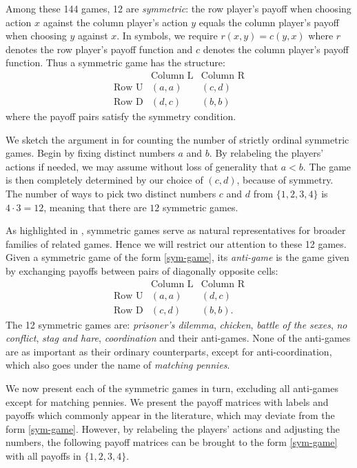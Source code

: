 \documentclass[11pt]{amsart}
\begin{document}
Among these 144 games, 12 are \textit{symmetric}: the row player's payoff when choosing action $x$ against the column player's action $y$ equals the column player's payoff when choosing $y$ against $x$. In symbols, we require $r(x, y) = c(y, x)$ where $r$ denotes the row player's payoff function and $c$ denotes the column player's payoff function. Thus a symmetric game has the structure:
\begin{equation} \label{sym-game}
\begin{array}{c|c|c}
  & \text{Column L} & \text{Column R} \\
\hline
\text{Row U} & (a, a) & (c, d) \\
\hline
\text{Row D} & (d, c) & (b, b)
\end{array}
\end{equation}
where the payoff pairs satisfy the symmetry condition.

We sketch the argument in \cite{top} for counting the number of strictly ordinal symmetric games. Begin by fixing distinct numbers $a$ and $b$. By relabeling the players' actions if needed, we may assume without loss of generality that $a < b$. The game is then completely determined by our choice of $(c, d)$, because of symmetry. The number of ways to pick two distinct numbers $c$ and $d$ from $\{1, 2, 3, 4\}$ is $4 \cdot 3 = 12$, meaning that there are $12$ symmetric games.

As highlighted in \cite{top}, symmetric games serve as natural representatives for broader families of related games. Hence we will restrict our attention to these 12 games. Given a symmetric game of the form \ref{sym-game}, its \textit{anti-game} is the game given by exchanging payoffs between pairs of diagonally opposite cells:
\[
\begin{array}{c|c|c}
  & \text{Column L} & \text{Column R} \\
\hline
\text{Row U} & (a, a) & (d, c) \\
\hline
\text{Row D} & (c, d) & (b, b).
\end{array}
\]
The 12 symmetric games are: \textit{prisoner's dilemma}, \textit{chicken}, \textit{battle of the sexes}, \textit{no conflict}, \textit{stag and hare}, \textit{coordination} and their anti-games. None of the anti-games are as important as their ordinary counterparts, except for anti-coordination, which also goes under the name of \textit{matching pennies}.

We now present each of the symmetric games in turn, excluding all anti-games except for matching pennies. We present the payoff matrices with labels and payoffs which commonly appear in the literature, which may deviate from the form \ref{sym-game}. However, by relabeling the players' actions and adjusting the numbers, the following payoff matrices can be brought to the form \ref{sym-game} with all payoffs in $\{1, 2, 3, 4\}$. 
\end{document}
